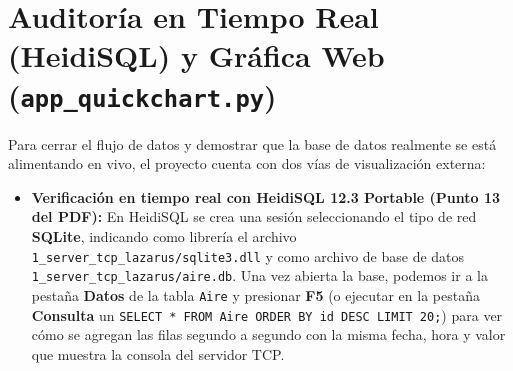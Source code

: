 \documentclass[11pt,a4paper]{article}
\begin{document}
\section{Auditoría en Tiempo Real (HeidiSQL) y Gráfica Web (\texttt{app\_quickchart.py})}

Para cerrar el flujo de datos y demostrar que la base de datos realmente se está alimentando en vivo, el proyecto cuenta con dos vías de visualización externa:

\begin{itemize}[leftmargin=1.5em, itemsep=0.35em]
    \item \textbf{Verificación en tiempo real con HeidiSQL 12.3 Portable (Punto 13 del PDF):}
    En HeidiSQL se crea una sesión seleccionando el tipo de red \textbf{SQLite}, indicando como librería el archivo \texttt{1\_server\_tcp\_lazarus/sqlite3.dll} y como archivo de base de datos \texttt{1\_server\_tcp\_lazarus/aire.db}. Una vez abierta la base, podemos ir a la pestaña \textbf{Datos} de la tabla \texttt{Aire} y presionar \textbf{F5} (o ejecutar en la pestaña \textbf{Consulta} un \texttt{SELECT * FROM Aire ORDER BY id DESC LIMIT 20;}) para ver cómo se agregan las filas segundo a segundo con la misma fecha, hora y valor que muestra la consola del servidor TCP.


\end{itemize}
\end{document}
